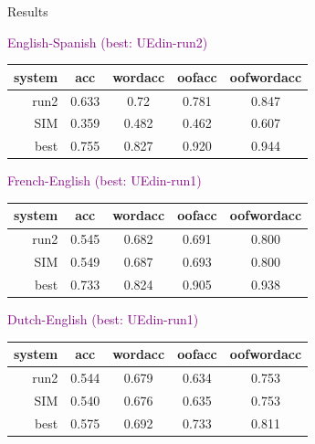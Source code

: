 \documentclass[final,t]{beamer}
\begin{document}
\begin{frame}{}
\begin{columns}[t]
\begin{column}{.5\linewidth}
\begin{block}{Results}
\begin{center}
  \textcolor{purple}{English-Spanish (best: UEdin-run2)}
  \begin{center}
  \begin{tabular}{|r|c|c|c|c|}
    \hline
    system & acc      & wordacc  & oofacc & oofwordacc \\
    \hline
    run2  &  0.633 & 0.72 & 0.781 & 0.847 \\
    SIM    &  0.359 &  0.482 & 0.462 & 0.607 \\
    best   &  0.755 & 0.827   & 0.920  & 0.944 \\
    \hline
  \end{tabular}
  \end{center}

 \textcolor{purple}{French-English (best: UEdin-run1)}
  \begin{center}
  \begin{tabular}{|r|c|c|c|c|}
    \hline
    system & acc      & wordacc  & oofacc & oofwordacc \\
    \hline
    run2  & 0.545  & 0.682 & 0.691 & 0.800 \\
    SIM        &  0.549 & 0.687 & 0.693 & 0.800 \\
    best & 0.733 & 0.824 & 0.905 & 0.938 \\
    \hline
  \end{tabular}
  \end{center}

  \textcolor{purple}{Dutch-English (best: UEdin-run1)}
  \begin{center}
  \begin{tabular}{|r|c|c|c|c|}
    \hline
    system & acc      & wordacc  & oofacc & oofwordacc \\
    \hline
    run2        &  0.544      &  0.679  & 0.634   & 0.753    \\
    SIM              &  0.540      &  0.676  & 0.635   & 0.753    \\
    best       &  0.575   & 0.692  & 0.733      &  0.811 \\
    \hline
  \end{tabular}
  \end{center}


\end{center}
\end{block}
\end{column}
\end{columns}
\end{frame}
\end{document}
